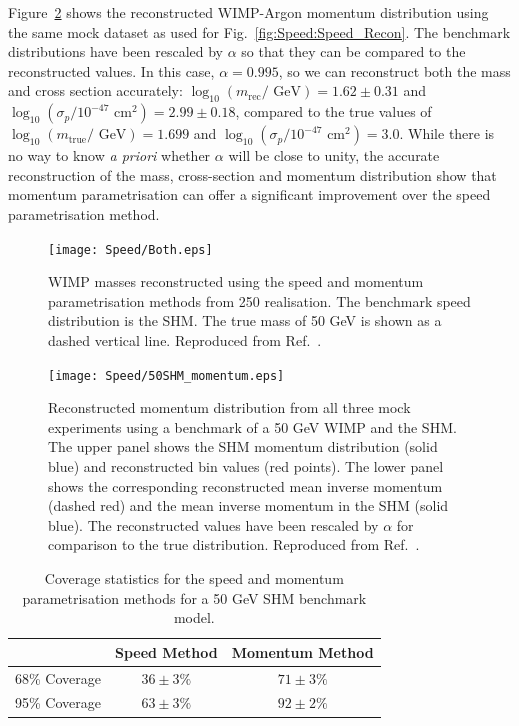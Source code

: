 Figure~\ref{fig:Speed:50SHM_momentum} shows the reconstructed WIMP-Argon momentum distribution using the same mock dataset as used for Fig.\ \ref{fig:Speed:Speed_Recon}. The benchmark distributions have been rescaled by \(\alpha\) so that they can be compared to the reconstructed values. In this case, \(\alpha = 0.995\), so we can reconstruct both the mass and cross section accurately: \(\log_{10} (m_\textrm{rec} / \textrm{ GeV}) = 1.62 \pm 0.31\) and \(\log_{10} (\sigma_p / 10^{-47} \textrm{ cm}^2) = 2.99 \pm 0.18\), compared to the true values of \(\log_{10} (m_\textrm{true} / \textrm{ GeV}) = 1.699\) and \(\log_{10} (\sigma_p / 10^{-47} \textrm{ cm}^2) = 3.0\). While there is no way to know \textit{a priori} whether \(\alpha\) will be close to unity, the accurate reconstruction of the mass, cross-section and momentum distribution show that momentum parametrisation can offer a significant improvement over the speed parametrisation method.

\begin{figure}[t]
\centering
  \texttt{[image: Speed/Both.eps]}
  \caption[Comparison of WIMP masses reconstructed using the binned speed and momentum parametrisations]{WIMP masses reconstructed using the speed and momentum parametrisation methods from 250 realisation. The benchmark speed distribution is the SHM. The true mass of 50 GeV is shown as a dashed vertical line. Reproduced from Ref.~\cite{Kavanagh:2012}.}
  \label{fig:Speed:both}
\end{figure}

\begin{figure}[t]
\centering
  \texttt{[image: Speed/50SHM\_momentum.eps]}
\caption[Reconstructed momentum distribution from all three mock experiments using a benchmark of a 50 GeV WIMP and the SHM]{Reconstructed momentum distribution from all three mock experiments using a benchmark of a 50 GeV WIMP and the SHM. The upper panel shows the SHM momentum distribution (solid blue) and reconstructed bin values (red points). The lower panel shows the corresponding reconstructed mean inverse momentum (dashed red) and the mean inverse momentum in the SHM (solid blue). The reconstructed values have been rescaled by \(\alpha\) for comparison to the true distribution. Reproduced from Ref.~\cite{Kavanagh:2012}.}
  \label{fig:Speed:50SHM_momentum}
\end{figure}

\begin{table}[t]
  \begin{center}
    \begin{tabular}{ccc}
    \hline\hline
    & Speed Method & Momentum Method \\
    \hline
    68\% Coverage & \(36 \pm 3 \%\) & \(71 \pm 3 \%\) \\
    95\% Coverage & \(63 \pm 3\%\) & \(92 \pm 2 \%\) \\
    \hline\hline
    \end{tabular}
  \end{center}
  \caption{Coverage statistics for the speed and momentum parametrisation methods for a 50 GeV SHM benchmark model.}
\label{tab:CoverageComparison}
\end{table}

